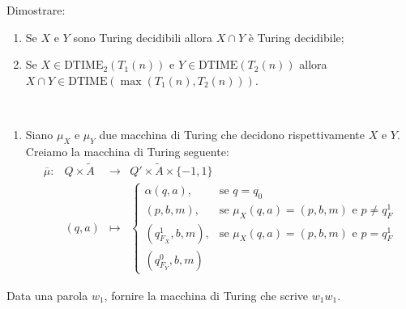 \begin{ex}
    Dimostrare:

\begin{enumerate}
    \item Se $X$ e $Y$ sono Turing decidibili allora $X \cap Y$ è Turing decidibile;
    \item Se $X \in \mathrm{DTIME}_2 (T_1(n))$ e
    $Y \in \mathrm{DTIME}(T_2(n))$
    allora $X \cap Y \in \mathrm{DTIME}(\operatorname{max}(T_1(n),T_2(n)))$.
\end{enumerate}
\end{ex}
\begin{sol}
    
    \ 
    \begin{enumerate}
        \item Siano $\mu_X$ e $\mu_Y$ due macchina di Turing
        che decidono rispettivamente $X$ e $Y$.
        Creiamo la macchina di Turing seguente:
         \[
        \begin{matrix}
            \overline{\mu} : & Q \times \tilde A 
            & \to & Q' \times \tilde A \times \{-1,1 \}
             \\ & 
            (q,a)
            &
            \mapsto 
            &
            \begin{cases}
                \alpha(q,a), & \text{se } q=q_0
                \\
                (p,b,m), & \text{se } \mu_X(q,a)=(p,b,m) \text{ e } p\neq q_F^1
                \\
                (q^1_{F_X},b,m), & \text{se } \mu_X(q,a)=(p,b,m) \text{ e } p= q_F^1
                \\
                (q^0_{F_Y},b,m)
               \end{cases}
        \end{matrix}
        \]
    \end{enumerate}
\end{sol}

\newpage

\begin{ex}\label{ex: macchina copia}
Data una parola $w_1$, fornire la macchina
di Turing che scrive $w_1w_1$.
\end{ex}

